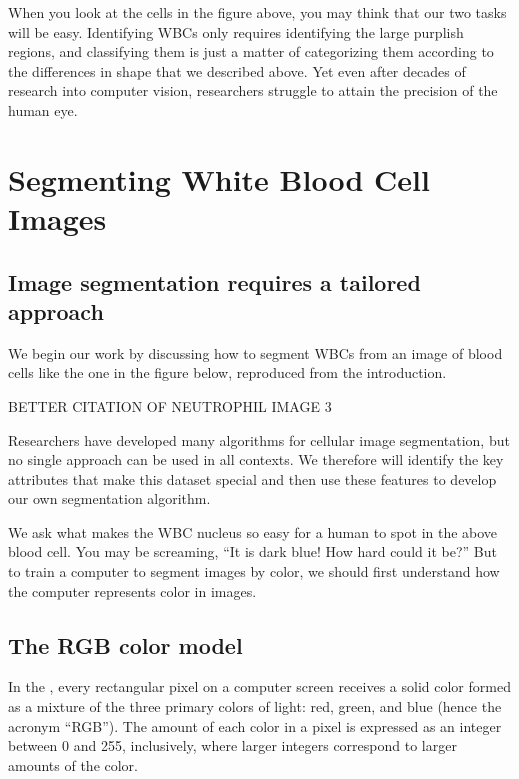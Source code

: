 When you look at the cells in the figure above, you may think that our two tasks will be easy. Identifying WBCs only requires identifying the large purplish regions, and classifying them is just a matter of categorizing them according to the differences in shape that we described above. Yet even after decades of research into computer vision, researchers struggle to attain the precision of the human eye.

\FloatBarrier
{}

\section{Segmenting White Blood Cell Images}
\label{sec:segmenting_white_blood_cell_images}
\subsection{Image segmentation requires a tailored approach}


We begin our work by discussing how to segment WBCs from an image of blood cells like the one in the figure below, reproduced from the introduction.

BETTER CITATION OF NEUTROPHIL IMAGE 3

Researchers have developed many algorithms for cellular image segmentation, but no single approach can be used in all contexts. We therefore will identify the key attributes that make this dataset special and then use these features to develop our own segmentation algorithm.

We ask what makes the WBC nucleus so easy for a human to spot in the above blood cell. You may be screaming, ``It is dark blue! How hard could it be?'' But to train a computer to segment images by color, we should first understand how the computer represents color in images.

\FloatBarrier
{}
\subsection{The RGB color model}

In the , every rectangular pixel on a computer screen receives a solid color formed as a mixture of the three primary colors of light: red, green, and blue (hence the acronym ``RGB''). The amount of each color in a pixel is expressed as an integer between 0 and 255, inclusively, where larger integers correspond to larger amounts of the color.

